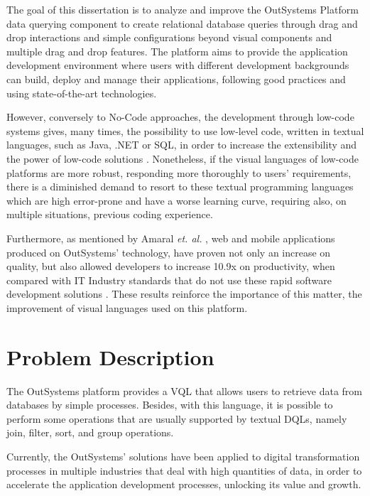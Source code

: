 The goal of this dissertation is to analyze and improve the OutSystems Platform \cite{outsystemsPlatform} data querying component to create relational database queries through drag and drop interactions and simple configurations beyond visual components and multiple drag and drop features. The platform aims to provide the application development environment where users with different development backgrounds can build, deploy and manage their applications, following good practices and using state-of-the-art technologies.

However, conversely to No-Code approaches, the development through low-code systems gives, many times, the possibility to use low-level code, written in textual languages, such as Java, .NET or \gls{SQL}, in order to increase the extensibility and the power of low-code solutions \cite{outsystems_lowcodeVsNocode}. 
Nonetheless, if the visual languages of low-code platforms are more robust, responding more thoroughly to users’ requirements, there is a diminished demand to resort to these textual programming languages which are high error-prone and have a worse learning curve, requiring also, on multiple situations, previous coding experience.

Furthermore, as mentioned by  Amaral \textit{et. al.} \cite{improvingTheDeveloperExperienceWithALowCodeProcessModellingLanguage}, web and mobile applications produced on OutSystems’ technology, have proven not only an increase on quality, but also allowed developers to increase 10.9x on productivity, when compared with \gls{IT} Industry standards that do not use these rapid software development solutions \cite{outByNumbers2013}. These results reinforce the importance of this matter, the improvement of visual languages used on this platform.


\section{Problem Description}
\label{sec:problem_description}
The OutSystems platform provides a \gls{VQL} that allows users to retrieve data from databases by simple processes. Besides, with this language, it is possible to perform some operations that are usually supported by textual \glspl{DQL}, namely join, filter, sort, and group operations.

Currently, the OutSystems’ solutions have been applied to digital transformation processes in multiple industries that deal with high quantities of data, in order to accelerate the application development processes, unlocking its value and growth.

